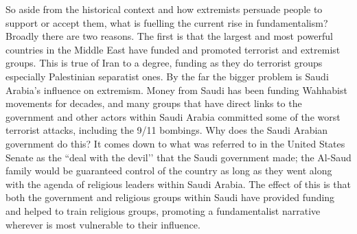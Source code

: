 \documentclass[10pt,a4paper]{article}
\newcounter{count}
\begin{document}
\begin{multicols}{2}
So aside from the historical context and how extremists persuade people to support or accept them, what is fuelling the current rise in fundamentalism? Broadly there are two reasons. The first is that the largest and most powerful countries in the Middle East have funded and promoted terrorist and extremist groups. This is true of Iran to a degree, funding as they do terrorist groups especially Palestinian separatist ones. By the far the bigger problem is Saudi Arabia’s influence on extremism. Money from Saudi has been funding Wahhabist movements for decades, and many groups that have direct links to the government and other actors within Saudi Arabia committed some of the worst terrorist attacks, including the 9/11 bombings. Why does the Saudi Arabian government do this? It comes down to what was referred to in the United States Senate as the ``deal with the devil’' that the Saudi government made; the Al-Saud family would be guaranteed control of the country as long as they went along with the agenda of religious leaders within Saudi Arabia. The effect of this is that both the government and religious groups within Saudi have provided funding and helped to train religious groups, promoting a fundamentalist narrative wherever is most vulnerable to their influence.


\end{multicols}
\end{document}
